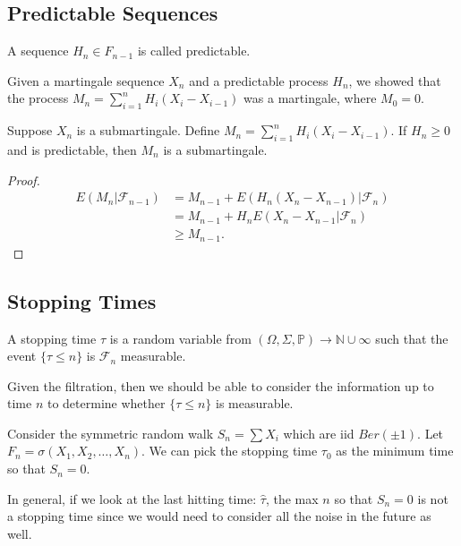 \documentclass[11pt]{scrartcl}
\newcommand{\N}{\mathbb{N}}
\renewcommand{\P}{\mathbb{P}}
\let \mc \mathcal
\begin{document}
\subsection{Predictable Sequences}
\begin{definition} A sequence $H_n \in F_{n-1}$ is called predictable.
\end{definition}
Given a martingale sequence $X_n$ and a predictable process $H_n$, we showed that the process $M_n = \sum_{i=1}^n H_i(X_i - X_{i-1})$ was a martingale, where $M_0 = 0$.

\begin{proposition}Suppose $X_n$ is a submartingale.  Define $M_n = \sum_{i=1}^n H_i(X_i - X_{i-1})$.  If $H_n \ge 0$ and is predictable, then $M_n$ is a submartingale.
\end{proposition}
\begin{proof}
\begin{align*}
E(M_n|\mc F_{n-1}) &= M_{n-1} + E(H_{n}(X_n - X_{n-1})| \mc F_n) \\
&= M_{n-1} + H_nE(X_{n} - X_{n-1}| \mc F_n ) \\
&\ge M_{n-1}.
\end{align*}
\end{proof}

\subsection{Stopping Times}
\begin{definition} A stopping time $\tau$ is a random variable from $(\Omega, \Sigma, \P) \to \N \cup \infty$ such that the event $\{\tau \le n\}$ is $\mc F_n$ measurable.
\end{definition}
\begin{remark} Given the filtration, then we should be able to consider the information up to time $n$ to determine whether $\{\tau \le n\}$ is measurable.
\end{remark}
\begin{example} Consider the symmetric random walk $S_n = \sum X_i$ which are iid $Ber(\pm 1)$.  Let $F_n = \sigma(X_1, X_2, \dots, X_n)$.  We can pick the stopping time $\tau_0$ as the minimum time so that $S_n = 0$.  

In general, if we look at the last hitting time: $\hat{\tau}$, the max $n$ so that $S_n = 0$ is not a stopping time since we would need to consider all the noise in the future as well.  
\end{example}
\end{document}
